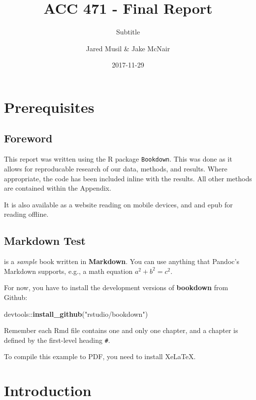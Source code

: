 \documentclass[12pt,]{book}
\title{ACC 471 - Final Report}
\subtitle{Subtitle}
\author{Jared Musil \& Jake McNair}
\date{2017-11-29}
\newenvironment{Shaded}{\begin{snugshade}}{\end{snugshade}}
\newcommand{\KeywordTok}[1]{\textcolor[rgb]{0.13,0.29,0.53}{\textbf{{#1}}}}
\newcommand{\StringTok}[1]{\textcolor[rgb]{0.31,0.60,0.02}{{#1}}}
\newcommand{\NormalTok}[1]{{#1}}
\theoremstyle{definition}
\theoremstyle{definition}
\theoremstyle{remark}
\begin{document}
\maketitle

{
\setcounter{tocdepth}{1}
\tableofcontents
}
\chapter{Prerequisites}\label{prerequisites}

\section{Foreword}\label{foreword}

This report was written using the R package \texttt{Bookdown}. This was
done as it allows for reproducable research of our data, methods, and
results. Where appropriate, the code has been included inline with the
results. All other methods are contained within the Appendix.

It is also available as a website reading on mobile devices, and and
epub for reading offline.

\section{Markdown Test}\label{markdown-test}

is a \emph{sample} book written in \textbf{Markdown}. You can use
anything that Pandoc's Markdown supports, e.g., a math equation
\(a^2 + b^2 = c^2\).

For now, you have to install the development versions of
\textbf{bookdown} from Github:

\begin{Shaded}
\begin{Highlighting}[]
\NormalTok{devtools::}\KeywordTok{install_github}\NormalTok{(}\StringTok{"rstudio/bookdown"}\NormalTok{)}
\end{Highlighting}
\end{Shaded}

Remember each Rmd file contains one and only one chapter, and a chapter
is defined by the first-level heading \texttt{\#}.

To compile this example to PDF, you need to install XeLaTeX.

\chapter{Introduction}\label{intro}
\end{document}
